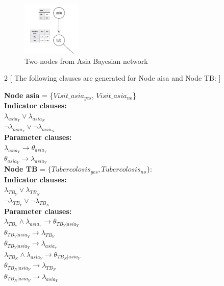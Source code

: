             \begin{figure}[h]
            \centering
            \includegraphics[width=0.25\textwidth]{pic/asia-tub.png}
            \caption{Two nodes from Asia Bayesian network}
            \label{fig:asia-tub}
            \end{figure}
            \begin{multicols}{2}
            [
            \noindent The following clauses are generated for Node aisa and Node TB:
            ]
            
            \noindent \textbf{Node asia} = \{$Visit\_asia_{yes}$, $Visit\_asia_{no}$\}\\
            \newline
            \textbf{Indicator clauses:}\\
            $\lambda_{asia_{Y}} \vee \lambda_{asia_{N}}$\\
            $\neg \lambda_{asia_{Y}} \vee \neg\lambda_{asia_{N}}$\\
            \newline
            \textbf{Parameter clauses:}\\
            $\lambda_{asia_{Y}} \rightarrow \theta_{asia_{Y}}$\\
            $\theta_{asia_{Y}} \rightarrow \lambda_{asia_{Y}}$\\
            
            \columnbreak
            \noindent \textbf{Node TB} = $\{Tubercolosis_{yes}, Tubercolosis_{no}\}$:\\
            \newline
            \textbf{Indicator clauses:}\\
            $\lambda_{TB_{Y}} \vee \lambda_{TB_{N}}$\\
            $\neg \lambda_{TB_{Y}} \vee \neg\lambda_{TB_{N}}$\\
            \newline
            \textbf{Parameter clauses:}\\
            $\lambda_{TB_{Y}} \wedge \lambda_{asia_{Y}}\rightarrow \theta_{TB_{Y}|asia_{Y}}$\\
            $\theta_{TB_{Y}|asia_{Y}} \rightarrow \lambda_{TB_{Y}}$\\
            $\theta_{TB_{Y}|asia_{Y}} \rightarrow \lambda_{asia_{Y}}$\\
            $\lambda_{TB_{N}} \wedge \lambda_{asia_{Y}} \rightarrow \theta_{TB_{N}|asia_{Y}}$\\
            $\theta_{TB_{N}|asia_{Y}} \rightarrow \lambda_{TB_{N}}$\\
            $\theta_{TB_{N}|asia_{Y}} \rightarrow \lambda_{asia_{Y}}$\\
            \end{multicols}
            
